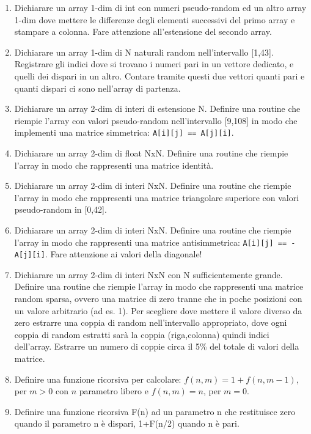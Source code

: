 \documentclass{article}
\begin{document}
\begin{enumerate}
\item Dichiarare un array 1-dim di int con numeri pseudo-random ed un altro array 1-dim dove mettere le differenze degli elementi successivi del primo array e stampare a colonna. Fare attenzione all'estensione del secondo array.

\item Dichiarare un array 1-dim di N naturali random nell'intervallo [1,43]. Registrare gli indici dove si trovano i numeri pari in un vettore dedicato, e quelli dei dispari in un altro. Contare tramite questi due vettori quanti pari e quanti dispari ci sono nell'array di partenza.

\item Dichiarare un array 2-dim di interi di estensione N. Definire una routine che riempie l'array con valori pseudo-random nell'intervallo [9,108] in modo che implementi una matrice simmetrica: \texttt{A[i][j] == A[j][i]}.

\item Dichiarare un array 2-dim di float NxN. Definire una routine che riempie l'array in modo che rappresenti una matrice identità.

\item Dichiarare un array 2-dim di interi NxN. Definire una routine che riempie l'array in modo che rappresenti una matrice triangolare superiore con valori pseudo-random in [0,42].

\item Dichiarare un array 2-dim di interi NxN. Definire una routine che riempie l'array in modo che rappresenti una matrice antisimmetrica: \texttt{A[i][j] == -A[j][i]}. Fare attenzione ai valori della diagonale!

\item Dichiarare un array 2-dim di interi NxN con N sufficientemente grande. Definire una routine che riempie l'array in modo che rappresenti una matrice random sparsa, ovvero una matrice di zero tranne che in poche posizioni con un valore arbitrario (ad es. 1). Per scegliere dove mettere il valore diverso da zero estrarre una coppia di random nell'intervallo appropriato, dove ogni coppia di random estratti sarà la coppia (riga,colonna) quindi indici dell'array. Estrarre un numero di coppie circa il 5\% del totale di valori della matrice.

\item Definire una funzione ricorsiva per calcolare: $f(n,m) = 1+f(n,m-1)$, per $m>0$ con $n$ parametro libero e $f(n,m) = n$, per $m=0$.

\item Definire una funzione ricorsiva F(n) ad un parametro n che restituisce zero quando il parametro n è dispari, 1+F(n/2) quando n è pari.


\end{enumerate}
\end{document}
